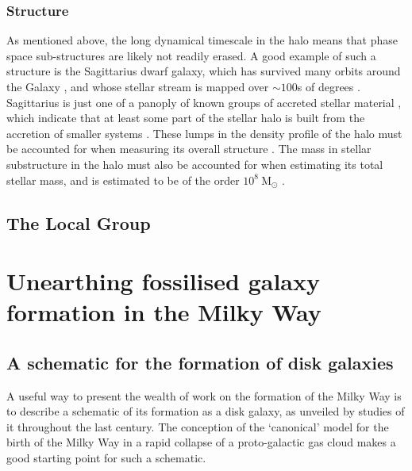 \subsubsection{Structure}
As mentioned above, the long dynamical timescale in the halo means that phase space sub-structures are likely not readily erased. A good example of such a structure is the Sagittarius dwarf galaxy, which has survived many orbits around the Galaxy \citep[e.g.][]{1997AJ....113..634I}, and whose stellar stream is mapped over $\sim 100$s of degrees \citep[e.g.][]{2003ApJ...596L.191N,2004AJ....128..245M,2006ApJ...642L.137B,2009ApJ...700.1282Y}. Sagittarius is just one of a panoply of known groups of accreted stellar material \citep[see e.g.][for a review]{2013NewAR..57..100B}, which indicate that at least some part of the stellar halo is built from the accretion of smaller systems \citep[as predicted in the seminal work of][which we discuss further in Section \ref{sec:galacticarchaeology}]{1978ApJ...225..357S}. These lumps in the density profile of the halo must be accounted for when measuring its overall structure \citep[e.g.][]{2011MNRAS.416.2903D}. The mass in stellar substructure in the halo must also be accounted for when estimating its total stellar mass, and is estimated to be of the order $10^8\ \mathrm{M_{\odot}}$ \citep[based on a recent review by][]{2016ARA&A..54..529B}. 

\subsection{The Local Group}

\section{Unearthing fossilised galaxy formation in the Milky Way}
\label{sec:galacticarchaeology}
\subsection{A schematic for the formation of disk galaxies}

A useful way to present the wealth of work on the formation of the Milky Way is to describe a schematic of its formation as a disk galaxy, as unveiled by studies of it throughout the last century. The conception of the `canonical' model for the birth of the Milky Way in a rapid collapse of a proto-galactic gas cloud \citep[the ELS model;][]{1962ApJ...136..748E} makes a good starting point for such a schematic. 

